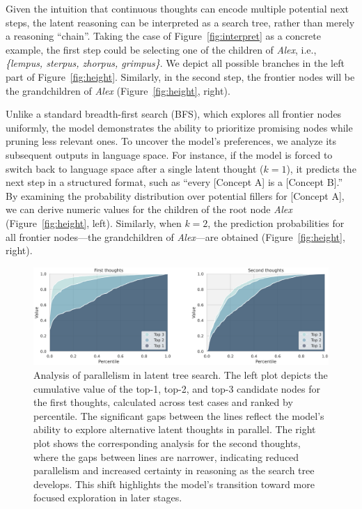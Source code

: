 \documentclass[]{fairmeta}
\begin{document}
Given the intuition that continuous thoughts can encode multiple potential next steps, the latent reasoning can be interpreted as a search tree, rather than merely a reasoning ``chain''. Taking the case of Figure~\ref{fig:interpret} as a concrete example, the first step could be selecting one of the children of \textit{Alex}, i.e., \textit{\{lempus, sterpus, zhorpus, grimpus\}}. We depict all possible branches in the left part of Figure~\ref{fig:height}. Similarly, in the second step, the frontier nodes will be the grandchildren of \textit{Alex} (Figure~\ref{fig:height}, right). 


Unlike a standard breadth-first search (BFS), which explores all frontier nodes uniformly, the model demonstrates the ability to prioritize promising nodes while pruning less relevant ones. To uncover the model's preferences, we analyze its subsequent outputs in language space. For instance, if the model is forced to switch back to language space after a single latent thought ($k=1$), it predicts the next step in a structured format, such as ``every [Concept A] is a [Concept B].'' By examining the probability distribution over potential fillers for [Concept A], we can derive numeric values for the children of the root node \textit{Alex} (Figure~\ref{fig:height}, left). Similarly, when $k=2$, the prediction probabilities for all frontier nodes—the grandchildren of \textit{Alex}—are obtained (Figure~\ref{fig:height}, right).


\begin{figure}
    \centering
    \includegraphics[width=\linewidth]{figures/percentile.png}
    \caption{Analysis of parallelism in latent tree search. The left plot depicts the cumulative value of the top-1, top-2, and top-3 candidate nodes for the first thoughts, calculated across test cases and ranked by percentile. The significant gaps between the lines reflect the model's ability to explore alternative latent thoughts in parallel. The right plot shows the corresponding analysis for the second thoughts, where the gaps between lines are narrower, indicating reduced parallelism and increased certainty in reasoning as the search tree develops. This shift highlights the model's transition toward more focused exploration in later stages.}
    \label{fig:percentile}
\end{figure}
\end{document}
